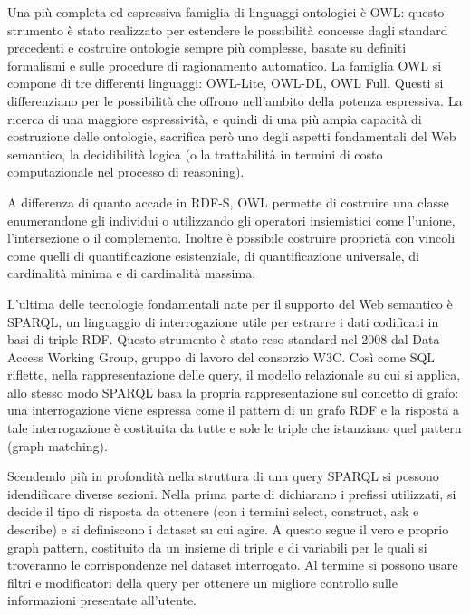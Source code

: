 \documentclass[Lau,binding=0.6cm,noexaminfo,oneside]{sapthesis}
\begin{document}
Una più completa ed espressiva famiglia di linguaggi ontologici è OWL: questo strumento è stato realizzato per estendere le possibilità concesse dagli standard precedenti e costruire ontologie sempre più complesse, basate su definiti formalismi e sulle procedure di ragionamento automatico. La famiglia OWL si compone di tre differenti linguaggi: OWL-Lite, OWL-DL, OWL Full.
Questi si differenziano per le possibilità che offrono nell'ambito della potenza espressiva. La ricerca di una maggiore espressività, e quindi di una più ampia capacità di costruzione delle ontologie, sacrifica però uno degli aspetti fondamentali del Web semantico, la decidibilità logica (o la trattabilità in termini di costo computazionale nel processo di reasoning).\medskip

A differenza di quanto accade in RDF-S, OWL permette di costruire una classe enumerandone gli individui o utilizzando gli operatori insiemistici come l'unione, l'intersezione o il complemento. Inoltre è possibile costruire proprietà con vincoli come quelli di quantificazione esistenziale,  di quantificazione universale, di cardinalità minima e di cardinalità massima.\medskip

L'ultima delle tecnologie fondamentali nate per il supporto del Web semantico è SPARQL, un linguaggio di interrogazione utile per estrarre i dati codificati in basi di triple RDF. Questo strumento è stato reso standard nel 2008 dal Data Access Working Group, gruppo di lavoro del consorzio W3C. Così come SQL riflette, nella rappresentazione delle query, il modello relazionale su cui si applica, allo stesso modo SPARQL basa la propria rappresentazione sul concetto di grafo: una interrogazione viene espressa come il pattern di un grafo RDF e la risposta a tale interrogazione è costituita da tutte e sole le triple che istanziano quel pattern (graph matching).\medskip

Scendendo più in profondità nella struttura di una query SPARQL si possono idendificare diverse sezioni. Nella prima parte di dichiarano i prefissi utilizzati, si decide il tipo di risposta da ottenere (con i termini select, construct, ask e describe) e si definiscono i dataset su cui agire. A questo segue il vero e proprio graph pattern, costituito da un insieme di triple e di variabili per le quali si troveranno le corrispondenze nel dataset interrogato. Al termine si possono usare filtri e modificatori della query per ottenere un migliore controllo sulle informazioni presentate all'utente.\medskip

\clearpage
\end{document}
